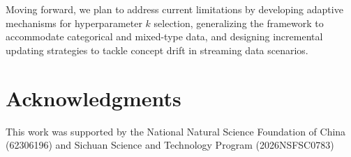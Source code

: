 \documentclass[times, review, 10pt]{elsarticle}
\begin{document}
Moving forward, we plan to address current limitations by developing adaptive mechanisms for hyperparameter $k$ selection, generalizing the framework to accommodate categorical and mixed-type data, and designing incremental updating strategies to tackle concept drift in streaming data scenarios.


\section*{Acknowledgments}

This work was supported by the National Natural Science Foundation of China (62306196) and Sichuan Science and Technology Program (2026NSFSC0783)




\end{document}
